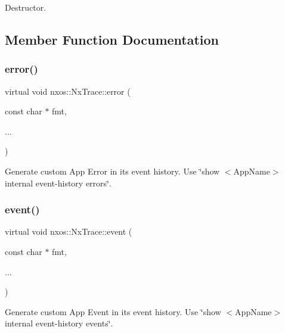Destructor. 



\subsection{Member Function Documentation}
\mbox{\label{classnxos_1_1_nx_trace_afc0240b6b9a291729836ffb2fbeef8a4}} 
\subsubsection{\texorpdfstring{error()}{error()}}
{\footnotesize\ttfamily virtual void nxos\+::\+Nx\+Trace\+::error (\begin{DoxyParamCaption}\item[{const char $\ast$}]{fmt,  }\item[{}]{... }\end{DoxyParamCaption})\hspace{0.3cm}{\ttfamily [pure virtual]}}

Generate custom App Error in its event history. Use \char`\"{}show $<$\+App\+Name$>$ internal event-\/history errors\char`\"{}. \mbox{\label{classnxos_1_1_nx_trace_a22e5e2fff39fae68fba3051dc2720621}} 
\subsubsection{\texorpdfstring{event()}{event()}}
{\footnotesize\ttfamily virtual void nxos\+::\+Nx\+Trace\+::event (\begin{DoxyParamCaption}\item[{const char $\ast$}]{fmt,  }\item[{}]{... }\end{DoxyParamCaption})\hspace{0.3cm}{\ttfamily [pure virtual]}}

Generate custom App Event in its event history. Use \char`\"{}show $<$\+App\+Name$>$ internal event-\/history events\char`\"{}. \mbox{\label{classnxos_1_1_nx_trace_a583b8a49a2111e4e4b8ef2f2eeaa4620}} 
